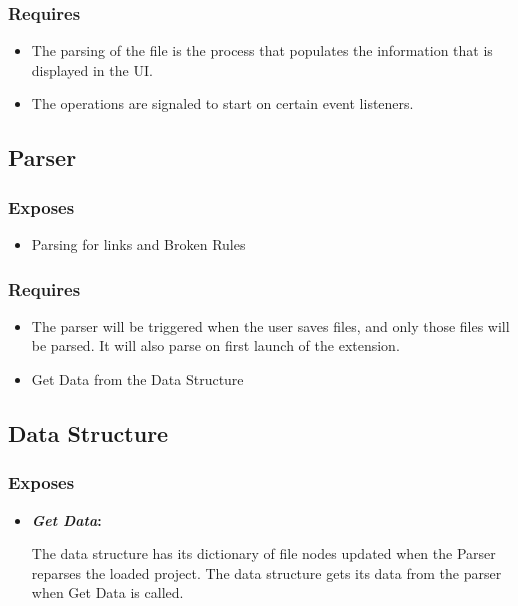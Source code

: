 \documentclass[letterpaper,10pt,titlepage,draftclsnofoot,onecolumn,onesided] {IEEEtran}
\newcommand{\boldit}[2]{
	\textbf{\textit{#1}#2}
}
\begin{document}
\subsubsection{Requires}
\begin{itemize}
	\item The parsing of the file is the process that populates the information that is displayed in the UI.
	\item The operations are signaled to start on certain event listeners.
\end{itemize}
			
\subsection{Parser}

\subsubsection{Exposes}
\begin{itemize}
	\item Parsing for links and Broken Rules
\end{itemize}
		
\subsubsection{Requires}
\begin{itemize}
	\item The parser will be triggered when the user saves files, and only those files will be parsed. 
It will also parse on first launch of the extension.
	\item Get Data from the Data Structure
\end{itemize}
	
\subsection{Data Structure}
		
\subsubsection{Exposes}
\begin{itemize}
	\item \boldit{Get Data}{:} 
The data structure has its dictionary of file nodes updated when the Parser reparses the loaded project. 
The data structure gets its data from the parser when Get Data is called.
\end{itemize}
		
\end{document}
